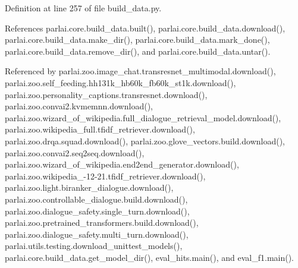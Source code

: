 Definition at line 257 of file build\+\_\+data.\+py.



References parlai.\+core.\+build\+\_\+data.\+built(), parlai.\+core.\+build\+\_\+data.\+download(), parlai.\+core.\+build\+\_\+data.\+make\+\_\+dir(), parlai.\+core.\+build\+\_\+data.\+mark\+\_\+done(), parlai.\+core.\+build\+\_\+data.\+remove\+\_\+dir(), and parlai.\+core.\+build\+\_\+data.\+untar().



Referenced by parlai.\+zoo.\+image\+\_\+chat.\+transresnet\+\_\+multimodal.\+download(), parlai.\+zoo.\+self\+\_\+feeding.\+hh131k\+\_\+hb60k\+\_\+fb60k\+\_\+st1k.\+download(), parlai.\+zoo.\+personality\+\_\+captions.\+transresnet.\+download(), parlai.\+zoo.\+convai2.\+kvmemnn.\+download(), parlai.\+zoo.\+wizard\+\_\+of\+\_\+wikipedia.\+full\+\_\+dialogue\+\_\+retrieval\+\_\+model.\+download(), parlai.\+zoo.\+wikipedia\+\_\+full.\+tfidf\+\_\+retriever.\+download(), parlai.\+zoo.\+drqa.\+squad.\+download(), parlai.\+zoo.\+glove\+\_\+vectors.\+build.\+download(), parlai.\+zoo.\+convai2.\+seq2seq.\+download(), parlai.\+zoo.\+wizard\+\_\+of\+\_\+wikipedia.\+end2end\+\_\+generator.\+download(), parlai.\+zoo.\+wikipedia\+\_-\/12-\/21.\+tfidf\+\_\+retriever.\+download(), parlai.\+zoo.\+light.\+biranker\+\_\+dialogue.\+download(), parlai.\+zoo.\+controllable\+\_\+dialogue.\+build.\+download(), parlai.\+zoo.\+dialogue\+\_\+safety.\+single\+\_\+turn.\+download(), parlai.\+zoo.\+pretrained\+\_\+transformers.\+build.\+download(), parlai.\+zoo.\+dialogue\+\_\+safety.\+multi\+\_\+turn.\+download(), parlai.\+utils.\+testing.\+download\+\_\+unittest\+\_\+models(), parlai.\+core.\+build\+\_\+data.\+get\+\_\+model\+\_\+dir(), eval\+\_\+hits.\+main(), and eval\+\_\+f1.\+main().

